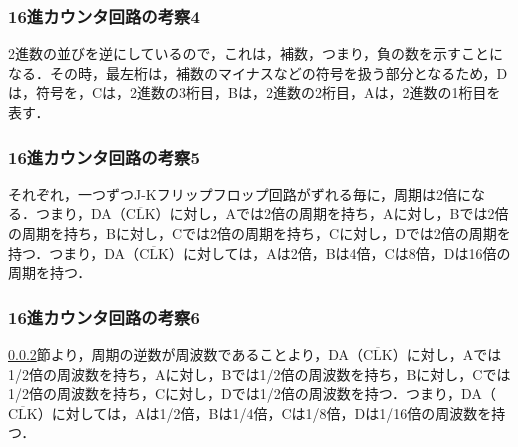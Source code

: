 %
%
\subsubsection{16進カウンタ回路の考察4}
\label{16counter_consideration4}
2進数の並びを逆にしているので，これは，補数，つまり，負の数を示すことになる．その時，最左桁は，補数のマイナスなどの符号を扱う部分となるため，Dは，符号を，Cは，2進数の3桁目，Bは，2進数の2桁目，Aは，2進数の1桁目を表す．
%
%
\subsubsection{16進カウンタ回路の考察5}
\label{16counter_consideration5}
それぞれ，一つずつJ-Kフリップフロップ回路がずれる毎に，周期は2倍になる．つまり，DA（$\overline{\mathrm{CLK}}$）に対し，Aでは2倍の周期を持ち，Aに対し，Bでは2倍の周期を持ち，Bに対し，Cでは2倍の周期を持ち，Cに対し，Dでは2倍の周期を持つ．つまり，DA（$\overline{\mathrm{CLK}}$）に対しては，Aは2倍，Bは4倍，Cは8倍，Dは16倍の周期を持つ．

%
%
\subsubsection{16進カウンタ回路の考察6}
\label{16counter_consideration6}
\ref{16counter_consideration5}節より，周期の逆数が周波数であることより，DA（$\overline{\mathrm{CLK}}$）に対し，Aでは1/2倍の周波数を持ち，Aに対し，Bでは1/2倍の周波数を持ち，Bに対し，Cでは1/2倍の周波数を持ち，Cに対し，Dでは1/2倍の周波数を持つ．つまり，DA（$\overline{\mathrm{CLK}}$）に対しては，Aは1/2倍，Bは1/4倍，Cは1/8倍，Dは1/16倍の周波数を持つ．



